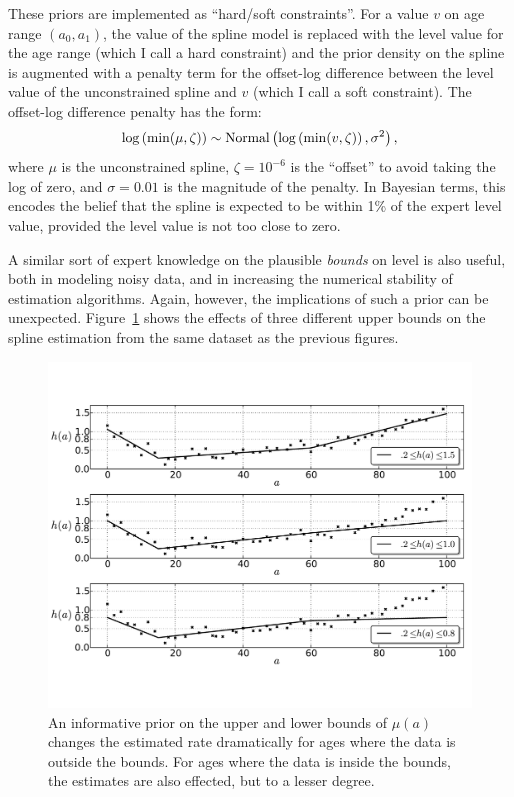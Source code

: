 These priors are implemented as ``hard/soft constraints''.  For a
value $v$ on age range $(a_0,a_1)$, the value of the spline model is
replaced with the level value for the age range (which I call a hard
constraint) and the prior density on the spline is augmented with a
penalty term for the offset-log difference between the level value of
the unconstrained spline and $v$ (which I call a soft constraint). The
offset-log difference penalty has the form:
\[
\log\left(\min(\mu, \zeta)\right) \sim \operatorname{Normal}\left(\log\left(\min(v, \zeta)\right), \sigma^2\right),
\]
where $\mu$ is the unconstrained spline, $\zeta = 10^{-6}$ is the
``offset'' to avoid taking the log of zero, and $\sigma = 0.01$ is the
magnitude of the penalty.  In Bayesian terms, this encodes the belief
that the spline is expected to be within 1\% of the expert level
value, provided the level value is not too close to zero.

A similar sort of expert knowledge on the plausible \emph{bounds} on
level is also useful, both in modeling noisy data, and in increasing
the numerical stability of estimation algorithms. Again, however, the
implications of such a prior can be unexpected.
Figure~\ref{level-bounds-priors} shows the effects of three different
upper bounds on the spline estimation from the same dataset as the
previous figures.

\begin{figure}[h]
\begin{center}
\includegraphics[width=\textwidth]{level_bound-smoothing-splines.pdf}
\caption{An informative prior on the upper and
lower bounds of $\mu(a)$ changes the estimated rate dramatically for
ages where the data is outside the bounds. For ages where the data is
inside the bounds, the estimates are also effected, but to a lesser
degree.}
\label{level-bounds-priors}
\end{center}
\end{figure}



